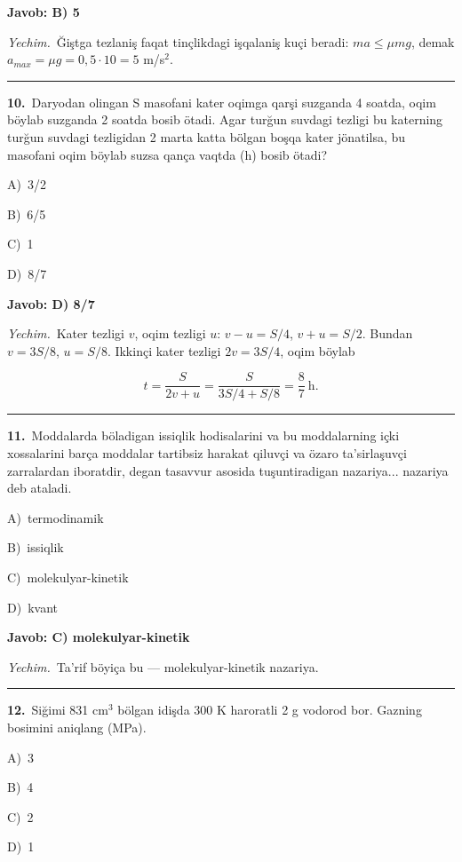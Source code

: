 \documentclass[11pt,a4paper]{article}
\newcommand{\opt}[2]{\hspace*{4mm}#1)\ #2\par}
\begin{document}
\noindent\colorbox{gray!12}{\parbox{\dimexpr\linewidth-2\fboxsep}{\textbf{Javob: B) 5}}}\par\smallskip
\noindent\textit{Yechim.}\ Ğiştga tezlaniş faqat tinçlikdagi işqalaniş kuçi beradi: $ma\le\mu mg$, demak $a_{max}=\mu g=0{,}5\cdot10=5$ m/s$^2$.\par\par\medskip\hrule\medskip
{}\noindent\begin{minipage}{\linewidth}
\textbf{10.}\ Daryodan olingan S masofani kater oqimga qarşi suzganda 4 soatda, oqim böylab suzganda 2 soatda bosib ötadi. Agar turğun suvdagi tezligi bu katerning turğun suvdagi tezligidan 2 marta katta bölgan boşqa kater jönatilsa, bu masofani oqim böylab suzsa qança vaqtda (h) bosib ötadi?\par\smallskip
\opt{A}{3/2}
\opt{B}{6/5}
\opt{C}{1}
\opt{D}{8/7}
\end{minipage}\vspace{2pt}\par
\noindent\colorbox{gray!12}{\parbox{\dimexpr\linewidth-2\fboxsep}{\textbf{Javob: D) 8/7}}}\par\smallskip
\noindent\textit{Yechim.}\ Kater tezligi $v$, oqim tezligi $u$: $v-u=S/4$, $v+u=S/2$. Bundan $v=3S/8$, $u=S/8$. Ikkinçi kater tezligi $2v=3S/4$, oqim böylab\par
\[t=\frac{S}{2v+u}=\frac{S}{3S/4+S/8}=\frac{8}{7}\ \text{h}.\]\par\medskip\hrule\medskip
{}\noindent\begin{minipage}{\linewidth}
\textbf{11.}\ Moddalarda böladigan issiqlik hodisalarini va bu moddalarning içki xossalarini barça moddalar tartibsiz harakat qiluvçi va özaro ta’sirlaşuvçi zarralardan iboratdir, degan tasavvur asosida tuşuntiradigan nazariya... nazariya deb ataladi.\par\smallskip
\opt{A}{termodinamik}
\opt{B}{issiqlik}
\opt{C}{molekulyar-kinetik}
\opt{D}{kvant}
\end{minipage}\vspace{2pt}\par
\noindent\colorbox{gray!12}{\parbox{\dimexpr\linewidth-2\fboxsep}{\textbf{Javob: C) molekulyar-kinetik}}}\par\smallskip
\noindent\textit{Yechim.}\ Ta’rif böyiça bu — molekulyar-kinetik nazariya.\par\par\medskip\hrule\medskip
{}\noindent\begin{minipage}{\linewidth}
\textbf{12.}\ Siğimi 831 cm$^{3}$ bölgan idişda 300 K haroratli 2 g vodorod bor. Gazning bosimini aniqlang (MPa).\par\smallskip
\opt{A}{3}
\opt{B}{4}
\opt{C}{2}
\opt{D}{1}
\end{minipage}\vspace{2pt}\par
\end{document}
